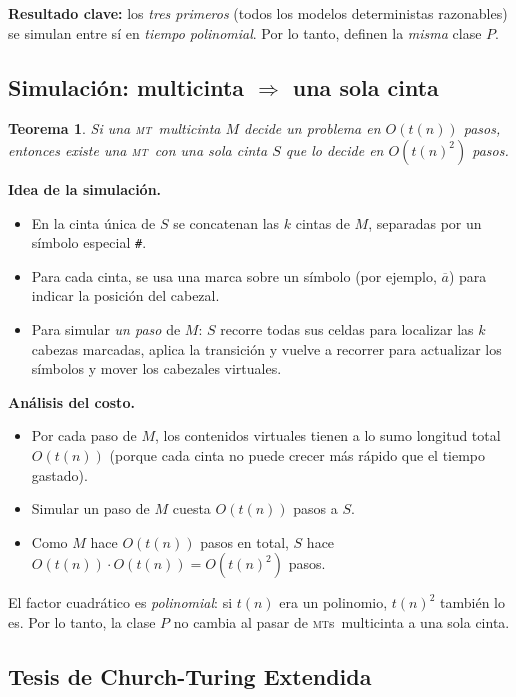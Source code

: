 \documentclass[11pt,a4paper]{article}
\theoremstyle{definicion}
\newtheorem{teorema}[definicion]{Teorema}
\newcommand{\MT}{\textsc{mt}}
\newcommand{\MTs}{\textsc{mt}s}
\begin{document}
\textbf{Resultado clave:} los \emph{tres primeros} (todos los modelos deterministas razonables) se simulan entre sí en \emph{tiempo polinomial}. Por lo tanto, definen la \emph{misma} clase $P$.

\subsection{Simulación: multicinta $\Rightarrow$ una sola cinta}

\begin{teorema}\label{teo:multi}
Si una \MT\ multicinta $M$ decide un problema en $O(t(n))$ pasos, entonces existe una \MT\ con una sola cinta $S$ que lo decide en $O(t(n)^2)$ pasos.
\end{teorema}

\textbf{Idea de la simulación.}
\begin{itemize}
    \item En la cinta única de $S$ se concatenan las $k$ cintas de $M$, separadas por un símbolo especial \texttt{\#}.
    \item Para cada cinta, se usa una marca sobre un símbolo (por ejemplo, $\overline{a}$) para indicar la posición del cabezal.
    \item Para simular \emph{un paso} de $M$: $S$ recorre todas sus celdas para localizar las $k$ cabezas marcadas, aplica la transición y vuelve a recorrer para actualizar los símbolos y mover los cabezales virtuales.
\end{itemize}

\textbf{Análisis del costo.}
\begin{itemize}
    \item Por cada paso de $M$, los contenidos virtuales tienen a lo sumo longitud total $O(t(n))$ (porque cada cinta no puede crecer más rápido que el tiempo gastado).
    \item Simular un paso de $M$ cuesta $O(t(n))$ pasos a $S$.
    \item Como $M$ hace $O(t(n))$ pasos en total, $S$ hace $O(t(n)) \cdot O(t(n)) = O(t(n)^2)$ pasos.
\end{itemize}

\begin{idea}
El factor cuadrático es \emph{polinomial}: si $t(n)$ era un polinomio, $t(n)^2$ también lo es. Por lo tanto, la clase $P$ no cambia al pasar de \MTs\ multicinta a una sola cinta.
\end{idea}

\subsection{Tesis de Church-Turing Extendida}
\end{document}
